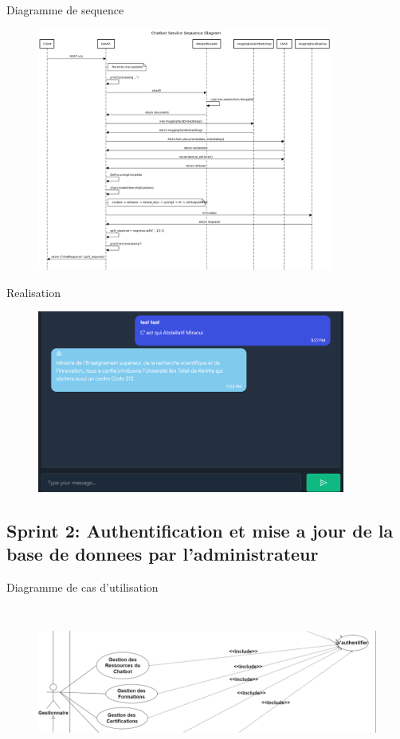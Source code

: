 \documentclass[aspectratio=169]{beamer}
\begin{document}
\begin{frame}{Diagramme de sequence}
    \begin{figure}[htpb]
        \centering
        \includegraphics[height=8cm]{pic/chatbot-seq.png}
    \end{figure}
\end{frame}

\begin{frame}{Realisation}
    \begin{figure}[htpb]
        \centering
        \includegraphics[height=6cm]{pic/chat2.png}
    \end{figure}
\end{frame}


\subsection{Sprint 2: Authentification et mise a jour de la
    base de donnees par l’administrateur}
\begin{frame}{Diagramme de cas d'utilisation}

    \begin{figure}[htpb]
        \centering
        \includegraphics[height=5cm]{pic/sprint2-usecase.png}
    \end{figure}
\end{frame}
\end{document}
